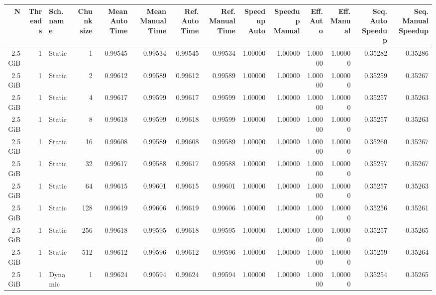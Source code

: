 \begin{table}[H]
            \centering
            \begin{adjustbox}{width=\textwidth, keepaspectratio}
                \begin{tabular}{rrlrrrrrrrrrrr}
                    \toprule
                    N & Threads & Sch. name & Chunk size & Mean Auto Time & Mean Manual Time & Ref. Auto Time & Ref. Manual Time & Speedup Auto & Speedup Manual & Eff. Auto & Eff. Manual & Seq. Auto Speedup & Seq. Manual Speedup \\
                    \midrule
                    2.5 GiB & 1 & Static & 1 & 0.99545 & 0.99534 & 0.99545 & 0.99534 & 1.00000 & 1.00000 & 1.00000 & 1.00000 & 0.35282 & 0.35286 \\
                    2.5 GiB & 1 & Static & 2 & 0.99612 & 0.99589 & 0.99612 & 0.99589 & 1.00000 & 1.00000 & 1.00000 & 1.00000 & 0.35259 & 0.35267 \\
                    2.5 GiB & 1 & Static & 4 & 0.99617 & 0.99599 & 0.99617 & 0.99599 & 1.00000 & 1.00000 & 1.00000 & 1.00000 & 0.35257 & 0.35263 \\
                    2.5 GiB & 1 & Static & 8 & 0.99618 & 0.99599 & 0.99618 & 0.99599 & 1.00000 & 1.00000 & 1.00000 & 1.00000 & 0.35257 & 0.35263 \\
                    2.5 GiB & 1 & Static & 16 & 0.99608 & 0.99589 & 0.99608 & 0.99589 & 1.00000 & 1.00000 & 1.00000 & 1.00000 & 0.35260 & 0.35267 \\
                    2.5 GiB & 1 & Static & 32 & 0.99617 & 0.99588 & 0.99617 & 0.99588 & 1.00000 & 1.00000 & 1.00000 & 1.00000 & 0.35257 & 0.35267 \\
                    2.5 GiB & 1 & Static & 64 & 0.99615 & 0.99601 & 0.99615 & 0.99601 & 1.00000 & 1.00000 & 1.00000 & 1.00000 & 0.35257 & 0.35263 \\
                    2.5 GiB & 1 & Static & 128 & 0.99619 & 0.99606 & 0.99619 & 0.99606 & 1.00000 & 1.00000 & 1.00000 & 1.00000 & 0.35256 & 0.35261 \\
                    2.5 GiB & 1 & Static & 256 & 0.99618 & 0.99595 & 0.99618 & 0.99595 & 1.00000 & 1.00000 & 1.00000 & 1.00000 & 0.35257 & 0.35265 \\
                    2.5 GiB & 1 & Static & 512 & 0.99612 & 0.99596 & 0.99612 & 0.99596 & 1.00000 & 1.00000 & 1.00000 & 1.00000 & 0.35259 & 0.35264 \\
                    2.5 GiB & 1 & Dynamic & 1 & 0.99624 & 0.99594 & 0.99624 & 0.99594 & 1.00000 & 1.00000 & 1.00000 & 1.00000 & 0.35254 & 0.35265 \\

\end{tabular}
\end{adjustbox}
\end{table}
